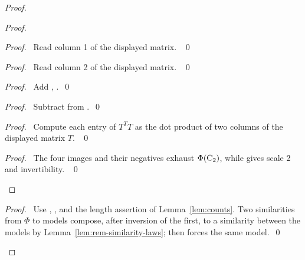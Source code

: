 \begin{proof}
\begin{proof}
\begin{proof}\pf\ Read column 1 of the displayed matrix. ~\qed\end{proof}
\begin{proof}\pf\ Read column 2 of the displayed matrix. ~\qed\end{proof}
\begin{proof}\pf\ Add , .~\qed\end{proof}
\begin{proof}\pf\ Subtract  from .~\qed\end{proof}
\begin{proof}\pf\ Compute each entry of $T^TT$ as the dot product of two columns of the displayed matrix $T$. ~\qed\end{proof}
\qedstep
\begin{proof}\pf\ The four images and their negatives exhaust
$\Phi(\mathrm{C}_2)$, while  gives scale 2 and invertibility. ~\qed\end{proof}
\end{proof}
\qedstep
\begin{proof}\pf\ Use , ,
 and the length assertion of
Lemma~\ref{lem:counts}. Two similarities from $\Phi$ to models
compose, after inversion of the first, to a similarity between the
models by Lemma~\ref{lem:rem-similarity-laws}; 
then forces the same model.~\qed\end{proof}
\end{proof}

